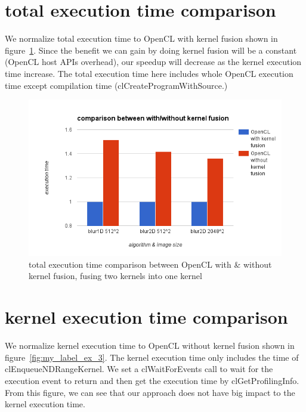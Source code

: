 \section{total execution time comparison}
    We normalize total execution time to OpenCL with kernel fusion shown in figure~\ref{fig:my_label_ex_2}. Since the benefit we can gain by doing kernel fusion will be a constant (OpenCL host APIs overhead), our speedup will decrease as the kernel execution time increase. The total execution time here includes whole OpenCL execution time except compilation time (clCreateProgramWithSource.)
    
\begin{figure}[hbtp]
\centering
\includegraphics[width=14cm]{img/with-without-2ker.png}
\caption{total execution time comparison between OpenCL with \& without kernel fusion, fusing two kernels into one kernel}
\label{fig:my_label_ex_2}
\end{figure}

\section{kernel execution time comparison}
    We normalize kernel execution time to OpenCL without kernel fusion shown in figure~\ref{fig:my_label_ex_3}. The kernel execution time only includes the time of clEnqueueNDRangeKernel. We set a clWaitForEvents call to wait for the execution event to return and then get the execution time by clGetProfilingInfo. From this figure, we can see that our approach does not have big impact to the kernel execution time.
    
